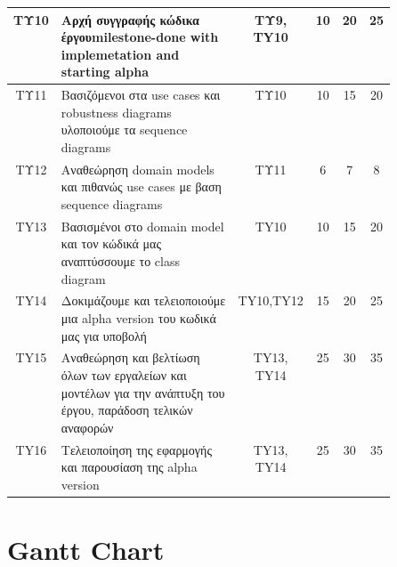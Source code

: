 \documentclass[11pt]{scrartcl} %
\begin{document}
\begin{table}[ht]
{\begin{tabular}{|c | p{0.5\linewidth} | c | c | c | c |}
TΥ10           & Αρχή συγγραφής κώδικα έργουmilestone-done with implemetation and starting alpha                                   & ΤΥ9, TY10  & 10        & 20       & 25          \\ \hline
TΥ11           & Βασιζόμενοι στα use cases και   robustness diagrams υλοποιούμε τα sequence diagrams                               & ΤΥ10       & 10        & 15       & 20          \\ \hline
TΥ12           & Αναθεώρηση domain models και πιθανώς   use cases με βαση sequence diagrams                                        & ΤΥ11       & 6         & 7        & 8           \\ \hline
TY13           & Βασισμένοι στο domain model και τον κώδικά μας αναπτύσσουμε το class diagram                                      & TY10       & 10        & 15       & 20          \\ \hline
TY14           & Δοκιμάζουμε και   τελειοποιούμε μια alpha version του κωδικά μας για υποβολή                                      & TY10,TY12  & 15        & 20       & 25          \\ \hline
TY15           & Αναθεώρηση και   βελτίωση όλων των εργαλείων και μοντέλων για την ανάπτυξη του έργου, παράδοση   τελικών αναφορών & TY13, TY14 & 25        & 30       & 35          \\ \hline
TY16           & Τελειοποίηση   της εφαρμογής και παρουσίαση της alpha version                                                     & TY13, TY14 & 25        & 30       & 35          \\ \hline       
\end{tabular}}
\end{table}
\pagebreak

\section{Gantt Chart}
\end{document}
